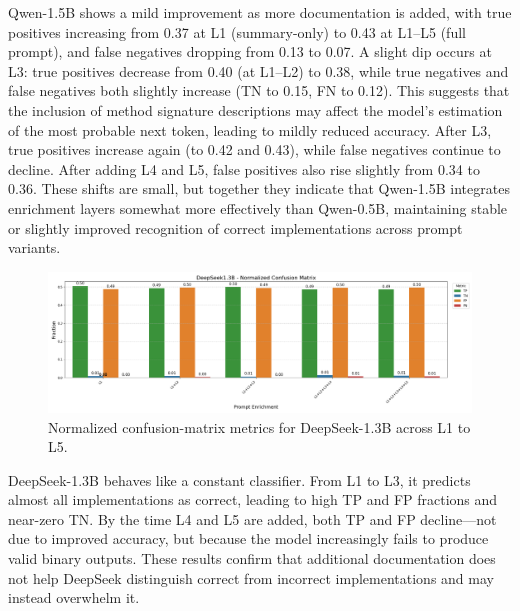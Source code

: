 \documentclass[a4paper]{usiinfbachelorproject}
\begin{document}
\noindent
Qwen-1.5B shows a mild improvement as more documentation is added, with true positives increasing from 0.37 at L1 (summary-only) to 0.43 at L1–L5 (full prompt), and false negatives dropping from 0.13 to 0.07. A slight dip occurs at L3: true positives decrease from 0.40 (at L1–L2) to 0.38, while true negatives and false negatives both slightly increase (TN to 0.15, FN to 0.12). This suggests that the inclusion of method signature descriptions may affect the model’s estimation of the most probable next token, leading to mildly reduced accuracy. After L3, true positives increase again (to 0.42 and 0.43), while false negatives continue to decline. After adding L4 and L5, false positives also rise slightly from 0.34 to 0.36. These shifts are small, but together they indicate that Qwen-1.5B integrates enrichment layers somewhat more effectively than Qwen-0.5B, maintaining stable or slightly improved recognition of correct implementations across prompt variants.
\begin{figure}[H]\centering
  \includegraphics[width=\linewidth]{figures/DeepSeek1.3B_matrix.png}
  \caption{Normalized confusion-matrix metrics for DeepSeek-1.3B across L1 to L5.}
  \label{fig:deepseek-matrix}
\end{figure}
\noindent
DeepSeek-1.3B behaves like a constant classifier. From L1 to L3, it predicts almost all implementations as correct, leading to high TP and FP fractions and near-zero TN. By the time L4 and L5 are added, both TP and FP decline—not due to improved accuracy, but because the model increasingly fails to produce valid binary outputs. These results confirm that additional documentation does not help DeepSeek distinguish correct from incorrect implementations and may instead overwhelm it.
\end{document}
